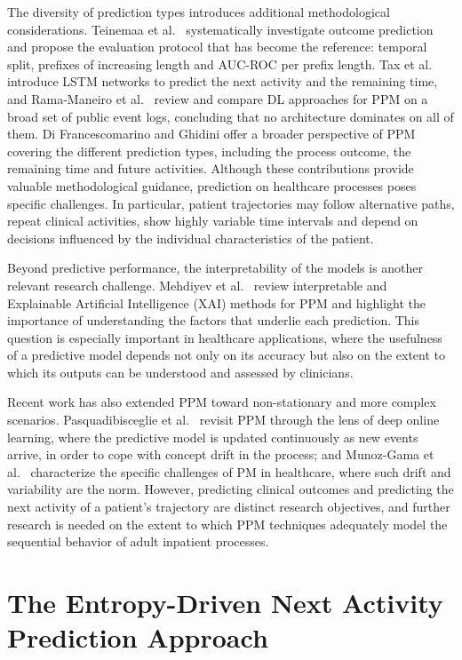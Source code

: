 The diversity of prediction types introduces additional methodological considerations. Teinemaa et al.\ \cite{teinemaa2019} systematically investigate outcome prediction and propose the evaluation protocol that has become the reference: temporal split, prefixes of increasing length and AUC-ROC per prefix length. Tax et al.\ \cite{tax2017} introduce LSTM networks to predict the next activity and the remaining time, and Rama-Maneiro et al.\ \cite{ramamaneiro2021} review and compare DL approaches for PPM on a broad set of public event logs, concluding that no architecture dominates on all of them. Di Francescomarino and Ghidini \cite{difrancescomarino2022} offer a broader perspective of PPM covering the different prediction types, including the process outcome, the remaining time and future activities. Although these contributions provide valuable methodological guidance, prediction on healthcare processes poses specific challenges. In particular, patient trajectories may follow alternative paths, repeat clinical activities, show highly variable time intervals and depend on decisions influenced by the individual characteristics of the patient.

Beyond predictive performance, the interpretability of the models is another relevant research challenge. Mehdiyev et al.\ \cite{mehdiyev2023} review interpretable and Explainable Artificial Intelligence (XAI) methods for PPM and highlight the importance of understanding the factors that underlie each prediction. This question is especially important in healthcare applications, where the usefulness of a predictive model depends not only on its accuracy but also on the extent to which its outputs can be understood and assessed by clinicians.

Recent work has also extended PPM toward non-stationary and more complex scenarios. Pasquadibisceglie et al.\ \cite{pasquadibisceglie2026} revisit PPM through the lens of deep online learning, where the predictive model is updated continuously as new events arrive, in order to cope with concept drift in the process; and Munoz-Gama et al.\ \cite{munoz2022} characterize the specific challenges of PM in healthcare, where such drift and variability are the norm. However, predicting clinical outcomes and predicting the next activity of a patient's trajectory are distinct research objectives, and further research is needed on the extent to which PPM techniques adequately model the sequential behavior of adult inpatient processes.

\section{The Entropy-Driven Next Activity Prediction Approach}
\label{sec:zare}

